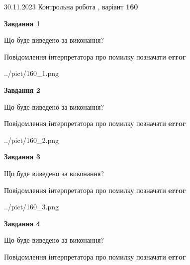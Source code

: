 \documentclass[12pt, ukrainian]{article}
\begin{document}
{{30.11.2023 Контрольна робота , варіант  \No \textbf { 160 }\par}}
{




{\begin {center}\textbf{Завдання 1}\end {center}}\par
Що буде виведено за виконання? \par
Повідомлення інтерпретатора про помилку позначати \textbf{error}

\begin{center}
	{../pict/160_1.png}
\end{center}
\newpage

{\begin {center}\textbf{Завдання 2}\end {center}}\par
Що буде виведено за виконання? \par
Повідомлення інтерпретатора про помилку позначати \textbf{error}

\begin{center}
	{../pict/160_2.png}
\end{center}
\newpage

{\begin {center}\textbf{Завдання 3}\end {center}}\par
Що буде виведено за виконання? \par
Повідомлення інтерпретатора про помилку позначати \textbf{error}

\begin{center}
	{../pict/160_3.png}
\end{center}
\newpage

{\begin {center}\textbf{Завдання 4}\end {center}}\par
Що буде виведено за виконання? \par
Повідомлення інтерпретатора про помилку позначати \textbf{error}

}
\end{document}
